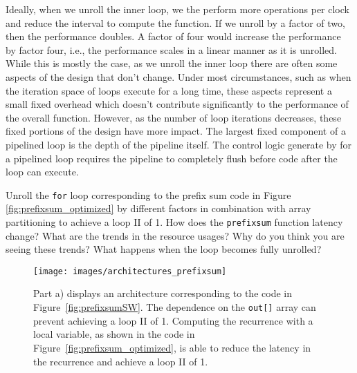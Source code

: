 %

%

Ideally, when we unroll the inner loop, we the perform more operations per clock and reduce the interval to compute the function. If we unroll by a factor of two, then the performance doubles. A factor of four would increase the performance by factor four, i.e., the performance scales in a linear manner as it is unrolled. While this is mostly the case, as we unroll the inner loop there are often some aspects of the design that don't change.  Under most circumstances, such as when the iteration space of loops execute for a long time, these aspects represent a small fixed overhead which doesn't contribute significantly to the performance of the overall function.  However, as the number of loop iterations decreases, these fixed portions of the design have more impact.  The largest fixed component of a pipelined loop is the depth of the pipeline itself.  The control logic generate by \VHLS for a pipelined loop requires the pipeline to completely flush before code after the loop can execute.

\begin{exercise}
Unroll the \lstinline{for} loop corresponding to the prefix sum code in Figure \ref{fig:prefixsum_optimized} by different factors in combination with array partitioning to achieve a loop II of 1.  How does the \lstinline{prefixsum} function latency change? What are the trends in the resource usages? Why do you think you are seeing these trends? What happens when the loop becomes fully unrolled?
\end{exercise}

\begin{figure}
\centering
\texttt{[image: images/architectures\_prefixsum]}
\caption{ Part a) displays an architecture corresponding to the code in Figure~\ref{fig:prefixsumSW}. The dependence on the \lstinline{out[]} array can prevent achieving a loop II of 1. Computing the recurrence with a local variable, as shown in the code in Figure~\ref{fig:prefixsum_optimized}, is able to reduce the latency in the recurrence and achieve a loop II of 1.}
\label{fig:architecture_prefixsum}
\end{figure}

